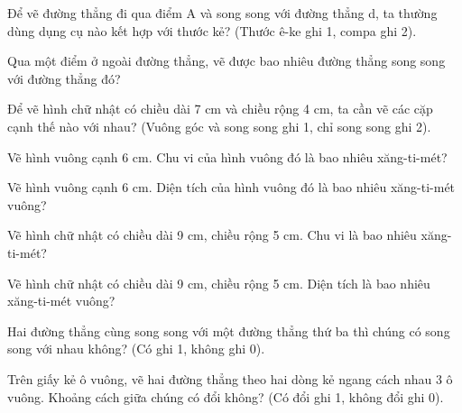 \begin{ex}
Để vẽ đường thẳng đi qua điểm A và song song với đường thẳng d, ta thường dùng dụng cụ nào kết hợp với thước kẻ? (Thước ê-ke ghi 1, compa ghi 2).
\end{ex}

\begin{ex}
Qua một điểm ở ngoài đường thẳng, vẽ được bao nhiêu đường thẳng song song với đường thẳng đó?
\end{ex}

\begin{ex}
Để vẽ hình chữ nhật có chiều dài 7 cm và chiều rộng 4 cm, ta cần vẽ các cặp cạnh thế nào với nhau? (Vuông góc và song song ghi 1, chỉ song song ghi 2).
\end{ex}

\begin{ex}
Vẽ hình vuông cạnh 6 cm. Chu vi của hình vuông đó là bao nhiêu xăng-ti-mét?
\end{ex}

\begin{ex}
Vẽ hình vuông cạnh 6 cm. Diện tích của hình vuông đó là bao nhiêu xăng-ti-mét vuông?
\end{ex}

\begin{ex}
Vẽ hình chữ nhật có chiều dài 9 cm, chiều rộng 5 cm. Chu vi là bao nhiêu xăng-ti-mét?
\end{ex}

\begin{ex}
Vẽ hình chữ nhật có chiều dài 9 cm, chiều rộng 5 cm. Diện tích là bao nhiêu xăng-ti-mét vuông?
\end{ex}

\begin{ex}
Hai đường thẳng cùng song song với một đường thẳng thứ ba thì chúng có song song với nhau không? (Có ghi 1, không ghi 0).
\end{ex}

\begin{ex}
Trên giấy kẻ ô vuông, vẽ hai đường thẳng theo hai dòng kẻ ngang cách nhau 3 ô vuông. Khoảng cách giữa chúng có đổi không? (Có đổi ghi 1, không đổi ghi 0).
\end{ex}

